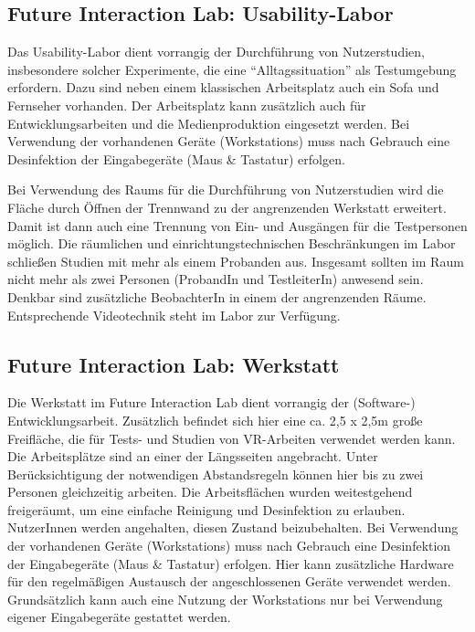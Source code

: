 \subsection{Future Interaction Lab: Usability-Labor}


\noindent
Das Usability-Labor dient vorrangig der Durchführung von Nutzerstudien, insbesondere solcher Experimente, die eine “Alltagssituation” als Testumgebung erfordern.
Dazu sind neben einem klassischen Arbeitsplatz auch ein Sofa und Fernseher vorhanden.
Der Arbeitsplatz kann zusätzlich auch für Entwicklungsarbeiten und die Medienproduktion eingesetzt werden.
Bei Verwendung der vorhandenen Geräte (Workstations) muss nach Gebrauch eine Desinfektion der Eingabegeräte (Maus \& Tastatur) erfolgen.

\medskip
\noindent
Bei Verwendung des Raums für die Durchführung von Nutzerstudien wird die Fläche  durch Öffnen der Trennwand zu der angrenzenden Werkstatt erweitert.
Damit ist dann auch eine Trennung von Ein- und Ausgängen für die Testpersonen möglich.
Die räumlichen und einrichtungstechnischen  Beschränkungen im Labor schließen Studien mit mehr als einem Probanden aus.
Insgesamt sollten im Raum nicht mehr als zwei Personen (ProbandIn und TestleiterIn) anwesend sein.
Denkbar sind zusätzliche BeobachterIn in einem der angrenzenden Räume.
Entsprechende Videotechnik steht im Labor zur Verfügung.

\subsection{Future Interaction Lab: Werkstatt}


\noindent
Die Werkstatt im Future Interaction Lab dient vorrangig der (Software-) Entwicklungsarbeit.
Zusätzlich befindet sich hier eine ca. 2,5 x 2,5m große Freifläche, die für Tests- und Studien von VR-Arbeiten verwendet werden kann.
Die Arbeitsplätze sind an einer der Längsseiten angebracht.
Unter Berücksichtigung der notwendigen Abstandsregeln können hier bis zu zwei Personen gleichzeitig arbeiten.
Die Arbeitsflächen wurden weitestgehend freigeräumt, um eine einfache Reinigung und Desinfektion zu erlauben.
NutzerInnen werden angehalten, diesen Zustand beizubehalten.
Bei Verwendung der vorhandenen Geräte (Workstations) muss nach Gebrauch eine Desinfektion der Eingabegeräte (Maus \& Tastatur) erfolgen.
Hier kann zusätzliche Hardware für den regelmäßigen Austausch der angeschlossenen Geräte verwendet werden.
Grundsätzlich kann auch eine Nutzung der Workstations nur bei Verwendung eigener Eingabegeräte gestattet werden.

